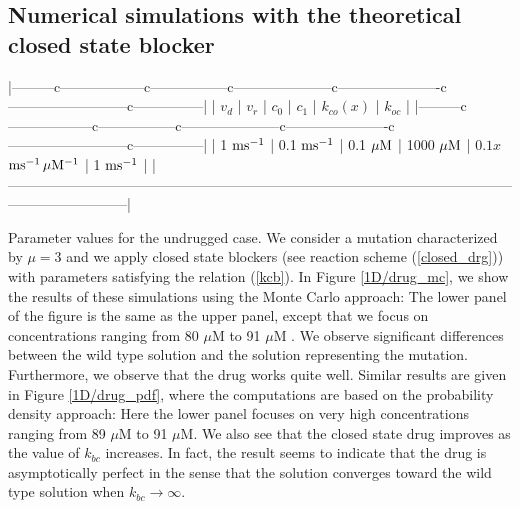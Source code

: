 \subsection{Numerical simulations with the theoretical closed state blocker}
\label{numsimtheoretical}
|---------c------------------c-----------------c---------------------c----------------------c--------------------------c---------------|
| $v_d$            | $v_r$              | $c_0$            | $c_1$             | $k_{co}(x)$                        | $k_{oc}$         |
|---------c------------------c-----------------c---------------------c----------------------c--------------------------c---------------|
| 1 $\rm{ms^{-1}}$ | 0.1 $\rm{ms^{-1}}$ | 0.1 $\rm{\mu M}$ | 1000 $\rm{\mu M}$ | $0.1x$ $\rm{ms^{-1}\, \mu M^{-1}}$ | 1 $\rm{ms^{-1}}$ |
|--------------------------------------------------------------------------------------------------------------------------------------|


Parameter values for the undrugged case.%
We consider a mutation characterized by $\mu=3$ and we apply closed state blockers (see reaction scheme (\ref{closed_drg})) with
parameters  satisfying the relation
(\ref{kcb}). In Figure \ref{1D/drug_mc}, we show the results of these simulations using the Monte Carlo approach: The lower panel of the figure is the same as the upper panel, except that we focus on concentrations ranging from 80 $\mu$M  to 91 $\mu$M . We observe significant differences between the wild type solution and the solution representing the mutation. Furthermore, we observe that the drug works quite well.  Similar results are given in Figure \ref{1D/drug_pdf}, where the computations are based on the probability density approach: Here the lower panel focuses on very high concentrations ranging from 89 $\mu$M  to 91 $\mu$M. We also see that the closed state drug improves as the value of $k_{bc}$ increases. In fact, the result seems to indicate that the drug is asymptotically perfect in the sense that the solution converges toward the wild type solution when $k_{bc}\rightarrow \infty$.


